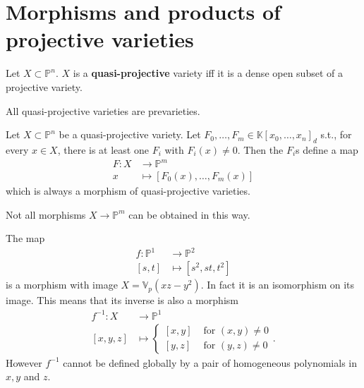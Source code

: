 \section{Morphisms and products of projective varieties}

\begin{defn}
	Let $X \subset \mathbb{P}^{n}$.
	$X$ is a \textbf{quasi-projective} variety iff it is a dense open subset of a projective variety.
\end{defn}

\begin{rem}
	All quasi-projective varieties are prevarieties.
\end{rem}

\begin{lem}
	Let $X \subset \mathbb{P}^{n}$ be a quasi-projective variety.
	Let $F_0, \ldots, F_m \in \mathbb{K}\left[x_0, \ldots, x_n \right]_d$ s.t., for every $x \in X$, there is at least one $F_i$ with $F_i(x) \neq 0$.
	Then the $F_i$s define a map
	\begin{align}
		F: X &\to \mathbb{P}^{m} \\
		x &\mapsto \left[ F_0(x) , \ldots , F_m(x) \right]
	\end{align} 
	which is always a morphism of quasi-projective varieties.
\end{lem} 

\begin{rem}
	Not all morphisms $X \to \mathbb{P}^{m}$ can be obtained in this way.
\end{rem}

\begin{ex}
	The map
	\begin{align}
		f: \mathbb{P}^{1} &\to \mathbb{P}^{2} \\
		\left[ s , t \right] &\mapsto \left[ s^2, st, t^2 \right]
	\end{align} 
	is a morphism with image $X = \mathbb{V}_p\left( xz - y^2 \right)$.
	In fact it is an isomorphism on its image.
	This means that its inverse is also a morphism
	\begin{align}
		f^{-1}: X &\to \mathbb{P}^{1} \\
		\left[ x, y, z \right] &\mapsto 
		\begin{cases}
			\left[ x, y \right] & \text{ for } \left( x, y \right) \neq 0 \\
			\left[ y, z \right] & \text{ for } \left( y, z \right) \neq 0 
		\end{cases} 
	.\end{align} 
	However $f^{-1}$ cannot be defined globally by a pair of homogeneous polynomials in $x, y$ and $z$.
\end{ex} 

